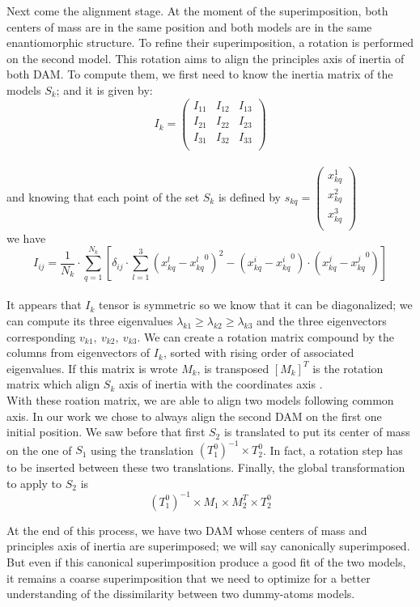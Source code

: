 \documentclass[a4paper, 11pt]{report}
\begin{document}
Next come the alignment stage. 
At the moment of the superimposition, both centers of mass are in the 
same position and both models are in the same enantiomorphic 
structure. 
To refine their superimposition, a rotation is performed on the second 
model. 
This rotation aims to align the principles axis of inertia of both 
DAM. 
To compute them, we first need to know the inertia matrix of the 
models $S_{k}$; and it is given by:
\[
I_{k}=
\begin{pmatrix}
 I_{11} & I_{12} & I_{13} \\
 I_{21} & I_{22} & I_{23} \\
 I_{31} & I_{32} & I_{33} \\
\end{pmatrix}
\]\\
and knowing that each point of the set $S_{k}$ is defined by
$
s_{kq}=
\begin{pmatrix}
 x_{kq}^1 \\
 x_{kq}^2 \\
 x_{kq}^3 \\
\end{pmatrix}
$\\
we have
\[
I_{ij} = \frac{1}{N_{k}} \cdot \sum\limits_{q=1}^{N_{k}} 
[\delta_{ij} \cdot \sum\limits_{l=1}^3 
 (x_{kq}^l - {x_{kq}^l}^0)^2 -  (x_{kq}^i - {x_{kq}^i}^0) 
 \cdot (x_{kq}^j - {x_{kq}^j}^0)]
\]\\
It appears that $I_{k}$ tensor is symmetric so we know that it can be 
diagonalized; we can compute its three eigenvalues 
$\lambda_{k1} \geq \lambda_{k2} \geq \lambda_{k3}$ and the three 
eigenvectors corresponding $v_{k1},\ v_{k2},\ v_{k3}$. 
We can create a rotation matrix compound by the columns from 
eigenvectors of $I_{k}$, sorted with rising order of associated 
eigenvalues. 
If this matrix is wrote $M_{k}$, is transposed $[M_{k}]^T$ is the 
rotation matrix which align $S_{k}$ axis of inertia with the 
coordinates axis \cite{supcomb}.\\
With these roation matrix, we are able to align two models following 
common axis. 
In our work we chose to always align the second DAM on the first one 
initial position. 
We saw before that first $S_{2}$ is translated to put its center of 
mass on the one of $S_{1}$ using the translation 
$(T_{1}^0)^{-1} \times T_{2}^0$. 
In fact, a rotation step has to be inserted between these two 
translations. 
Finally, the global transformation to apply to $S_{2}$ is 
\[(T_{1}^0)^{-1} \times M_{1} \times M_{2}^T \times T_{2}^0\]

At the end of this process, we have two DAM whose centers of mass and 
principles axis of inertia are superimposed; we will say canonically 
superimposed. 
But even if this canonical superimposition produce a good fit of the 
two models, it remains a coarse superimposition that we need to 
optimize for a better understanding of the dissimilarity between two 
dummy-atoms models.
\end{document}
